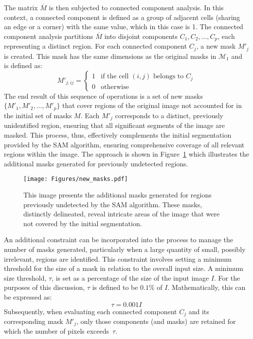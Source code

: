 The matrix $\overline{M}$ is then subjected to connected component analysis. In this context, a connected component is defined as a group of adjacent cells (\ie sharing an edge or a corner) with the same value, which in this case is 1. The connected component analysis partitions $\overline{M}$ into disjoint components $ C_1, C_2, \ldots, C_p $, each representing a distinct region. For each connected component $ C_j $, a new mask $ M'_j$ is created. This mask has the same dimensions as the original masks in $\mathcal{M}_1$ and is defined as:
\begin{equation} M'_{j,ij} = \begin{cases} 
   1 & \text{if the cell } (i, j) \text{ belongs to } C_j \\
   0 & \text{otherwise} 
   \end{cases}
\end{equation} 
The end result of this sequence of operations is a set of new masks $ \{M'_1, M'_2, \ldots, M'_p\} $ that cover regions of the original image not accounted for in the initial set of masks $ M $. Each $ M'_j $ corresponds to a distinct, previously unidentified region, ensuring that all significant segments of the image are masked. This process, thus, effectively complements the initial segmentation provided by the SAM algorithm, ensuring comprehensive coverage of all relevant regions within the image. The approach is shown in Figure~\ref{Fig:new_masks} which illustrates the additional masks generated for previously undetected regions.

\begin{figure}[ht!]
\begin{center}
\texttt{[image: Figures/new\_masks.pdf]}
\end{center}
\caption{This image presents the additional masks generated for regions previously undetected by the SAM algorithm. These masks, distinctly delineated, reveal intricate areas of the image that were not covered by the initial segmentation.}
\label{Fig:new_masks}
\end{figure} 

An additional constraint can be incorporated into the process to manage the number of masks generated, particularly when a large quantity of small, possibly irrelevant, regions are identified. This constraint involves setting a minimum threshold for the size of a mask in relation to the overall input size. A minimum size threshold, $\tau$, is set as a percentage of the size of the input image $I$. For the purposes of this discussion, $\tau$ is defined to be $0.1\%$ of $I$. Mathematically, this can be expressed as:
\begin{equation} 
\tau = 0.001I 
\end{equation}
Subsequently, when evaluating each connected component $C_j$ and its corresponding mask $M'_j$, only those components (and masks) are retained for which the number of pixels exceeds~$\tau$. 

